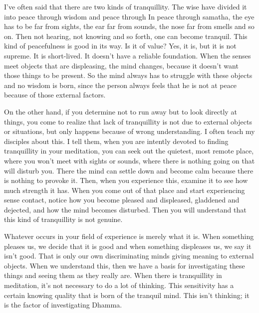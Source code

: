I've often said that there are two kinds of tranquillity. The wise have divided it into peace through wisdom and peace through  In peace through samatha, the eye has to be far from sights, the ear far from sounds, the nose far from smells and so on. Then not hearing, not knowing and so forth, one can become tranquil. This kind of peacefulness is good in its way. Is it of value? Yes, it is, but it is not supreme. It is short-lived. It doesn't have a reliable foundation. When the senses meet objects that are displeasing, the mind changes, because it doesn't want those things to be present. So the mind always has to struggle with these objects and no wisdom is born, since the person always feels that he is not at peace because of those external factors.

On the other hand, if you determine not to run away but to look directly at things, you come to realize that lack of tranquillity is not due to external objects or situations, but only happens because of wrong understanding. I often teach my disciples about this. I tell them, when you are intently devoted to finding tranquillity in your meditation, you can seek out the quietest, most remote place, where you won't meet with sights or sounds, where there is nothing going on that will disturb you. There the mind can settle down and become calm because there is nothing to provoke it. Then, when you experience this, examine it to see how much strength it has. When you come out of that place and start experiencing sense contact, notice how you become pleased and displeased, gladdened and dejected, and how the mind becomes disturbed. Then you will understand that this kind of tranquillity is not genuine.

Whatever occurs in your field of experience is merely what it is. When something pleases us, we decide that it is good and when something displeases us, we say it isn't good. That is only our own discriminating minds giving meaning to external objects. When we understand this, then we have a basis for investigating these things and seeing them as they really are. When there is tranquillity in meditation, it's not necessary to do a lot of thinking. This sensitivity has a certain knowing quality that is born of the tranquil mind. This isn't thinking; it is  the factor of investigating Dhamma.

